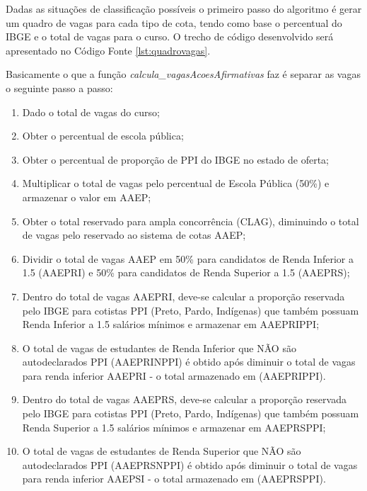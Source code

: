 

\newpage
Dadas as situações de classificação possíveis o primeiro passo do algoritmo é gerar um quadro de vagas para cada tipo de cota, tendo como base o percentual do \gls{IBGE} e o total de vagas para o curso. O trecho de código desenvolvido será apresentado no Código Fonte \ref{lst:quadrovagas}.




Basicamente o que a função \textit{calcula\_vagasAcoesAfirmativas} faz é separar as vagas o seguinte passo a passo:

\begin{enumerate}
    \item Dado o total de vagas do curso;
    \item Obter o percentual de escola pública;
    \item Obter o percentual de proporção de PPI do IBGE no estado de oferta;
    \item Multiplicar o total de vagas pelo percentual de Escola Pública (50\%) e armazenar o valor em AAEP;
    \item Obter o total reservado para ampla concorrência (CLAG), diminuindo o total de vagas pelo reservado ao sistema de cotas AAEP;
    \item Dividir o total de vagas AAEP em 50\% para candidatos de Renda Inferior a 1.5 (AAEPRI) e 50\% para candidatos de Renda Superior a 1.5 (AAEPRS);
    \item Dentro do total de vagas AAEPRI, deve-se calcular a proporção reservada pelo IBGE para cotistas PPI (Preto, Pardo, Indígenas) que também possuam Renda Inferior a 1.5 salários mínimos e armazenar em AAEPRIPPI;
    \item O total de vagas de estudantes de Renda Inferior que NÃO são autodeclarados PPI (AAEPRINPPI) é obtido após diminuir o total de vagas para renda inferior AAEPRI - o total armazenado em (AAEPRIPPI).
    \item Dentro do total de vagas AAEPRS, deve-se calcular a proporção reservada pelo IBGE para cotistas PPI (Preto, Pardo, Indígenas) que também possuam Renda Superior a 1.5 salários mínimos e armazenar em AAEPRSPPI;
    \item O total de vagas de estudantes de Renda Superior que NÃO são autodeclarados PPI (AAEPRSNPPI) é obtido após diminuir o total de vagas para renda inferior AAEPSI - o total armazenado em (AAEPRSPPI).
\end{enumerate}{}

